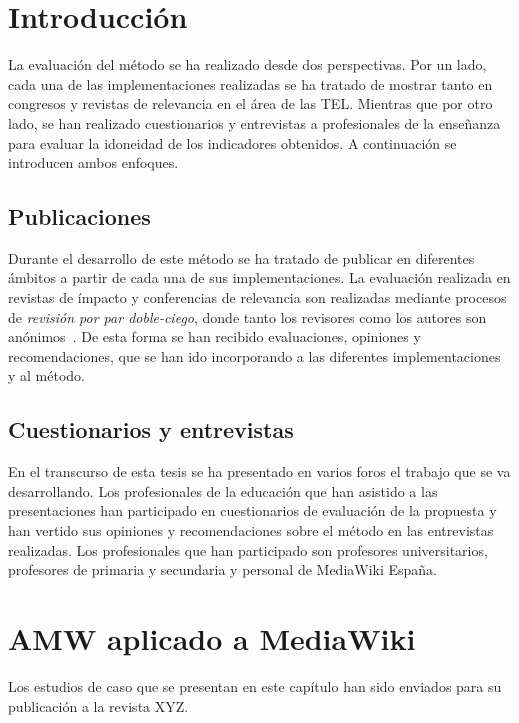 \section{Introducción}

La evaluación del método se ha realizado desde dos perspectivas. Por un lado, cada una de las implementaciones realizadas se ha tratado de mostrar tanto en congresos y revistas de relevancia en el área de las TEL. Mientras que por otro lado, se han realizado cuestionarios y entrevistas a profesionales de la enseñanza para evaluar la idoneidad de los indicadores obtenidos. A continuación se introducen ambos enfoques.

\subsection{Publicaciones}

Durante el desarrollo de este método se ha tratado de publicar en diferentes ámbitos a partir de cada una de sus implementaciones. La evaluación realizada en revistas de ímpacto y conferencias de relevancia son realizadas mediante procesos de \emph{revisión por par doble-ciego}, donde tanto los revisores como los autores son anónimos~\cite{ladron2008revision}. De esta forma se han recibido evaluaciones, opiniones y recomendaciones, que se han ido incorporando a las diferentes implementaciones y al método.

\subsection{Cuestionarios y entrevistas}

En el transcurso de esta tesis se ha presentado en varios foros el trabajo que se va desarrollando. Los profesionales de la educación que han asistido a las presentaciones han participado en cuestionarios de evaluación de la propuesta y han vertido sus opiniones y recomendaciones sobre el método en las entrevistas realizadas. Los profesionales que han participado son profesores universitarios, profesores de primaria y secundaria y personal de MediaWiki España.

\section{AMW aplicado a MediaWiki}

Los estudios de caso que se presentan en este capítulo han sido enviados para su publicación a la revista XYZ.


